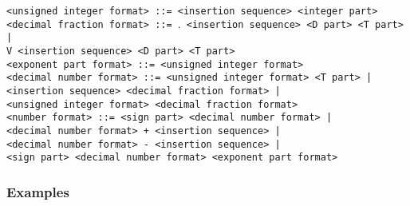 \documentclass[a4paper,11pt]{article}
\begin{document}
\begin{flushleft}
\vspace{0.2em}\texttt{<unsigned integer format> ::= <insertion sequence> <integer part>}\\

\vspace{0.2em}\texttt{<decimal fraction format> ::= $.$ <insertion sequence> <D part> <T part> |\\
  \hspace{1.0cm}V <insertion sequence> <D part> <T part>}\\

\vspace{0.2em}\texttt{<exponent part format> ::=  <unsigned integer format>}\\

\vspace{0.2em}\texttt{<decimal number format> ::= <unsigned integer format> <T part> |\\
  \hspace{1.0cm}<insertion sequence> <decimal fraction format> |\\
  \hspace{1.0cm}<unsigned integer format> <decimal fraction format>}\\

\vspace{0.2em}\texttt{<number format> ::= <sign part> <decimal number format> |\\
  \hspace{1.0cm}<decimal number format> + <insertion sequence> |\\
  \hspace{1.0cm}<decimal number format> - <insertion sequence> |\\
  \hspace{1.0cm}<sign part> <decimal number format> <exponent part format>}\\
\end{flushleft}


\subsubsection{Examples}
\end{document}
